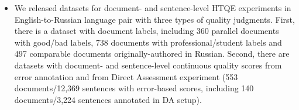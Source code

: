 \begin{itemize}
	\item We released datasets for document- and sentence-level \gls{HTQE} experiments in English-to-Russian language pair with three types of quality judgments. First, there is a dataset with document labels, including 360 parallel documents with good/bad labels, 738 documents with professional/student labels and 497 comparable documents originally-authored in Russian. Second, there are datasets with document- and sentence-level continuous quality scores from error annotation and from Direct Assessment experiment (553 documents/12,369 sentences with error-based scores, including 140 documents/3,224 sentences annotated in DA setup).

\end{itemize}


